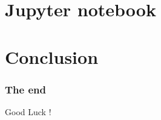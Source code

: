 \documentclass[xcolor=pdftex,dvipsnames,table,mathserif]{beamer}
\begin{document}
\section{Jupyter notebook}







\section{Conclusion}


\begin{frame}
  \frametitle{The end}

  \vspace{3ex}

  \centering
  \Large Good Luck !

\end{frame}
\end{document}
